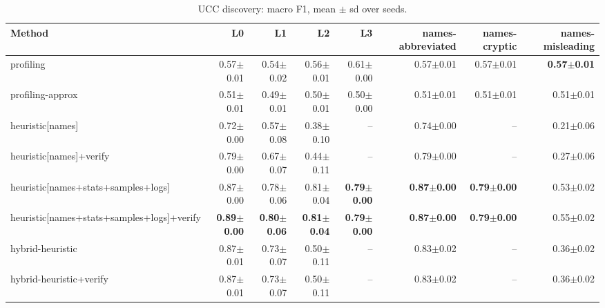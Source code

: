 \begin{table}[t]
  \centering
  \scriptsize
  \caption{UCC discovery: macro F1, mean $\pm$ sd over seeds.}
  \label{tab:bench-ucc}
  \begin{tabular}{lrrrrrrr}
    \toprule
    Method & L0 & L1 & L2 & L3 & names-abbreviated & names-cryptic & names-misleading \\
    \midrule
    profiling & 0.57{\scriptsize$\pm$0.01} & 0.54{\scriptsize$\pm$0.02} & 0.56{\scriptsize$\pm$0.01} & 0.61{\scriptsize$\pm$0.00} & 0.57{\scriptsize$\pm$0.01} & 0.57{\scriptsize$\pm$0.01} & \textbf{0.57{\scriptsize$\pm$0.01}} \\
    profiling-approx & 0.51{\scriptsize$\pm$0.01} & 0.49{\scriptsize$\pm$0.01} & 0.50{\scriptsize$\pm$0.01} & 0.50{\scriptsize$\pm$0.00} & 0.51{\scriptsize$\pm$0.01} & 0.51{\scriptsize$\pm$0.01} & 0.51{\scriptsize$\pm$0.01} \\
    heuristic[names] & 0.72{\scriptsize$\pm$0.00} & 0.57{\scriptsize$\pm$0.08} & 0.38{\scriptsize$\pm$0.10} & -- & 0.74{\scriptsize$\pm$0.00} & -- & 0.21{\scriptsize$\pm$0.06} \\
    heuristic[names]+verify & 0.79{\scriptsize$\pm$0.00} & 0.67{\scriptsize$\pm$0.07} & 0.44{\scriptsize$\pm$0.11} & -- & 0.79{\scriptsize$\pm$0.00} & -- & 0.27{\scriptsize$\pm$0.06} \\
    heuristic[names+stats+samples+logs] & 0.87{\scriptsize$\pm$0.00} & 0.78{\scriptsize$\pm$0.06} & 0.81{\scriptsize$\pm$0.04} & \textbf{0.79{\scriptsize$\pm$0.00}} & \textbf{0.87{\scriptsize$\pm$0.00}} & \textbf{0.79{\scriptsize$\pm$0.00}} & 0.53{\scriptsize$\pm$0.02} \\
    heuristic[names+stats+samples+logs]+verify & \textbf{0.89{\scriptsize$\pm$0.00}} & \textbf{0.80{\scriptsize$\pm$0.06}} & \textbf{0.81{\scriptsize$\pm$0.04}} & \textbf{0.79{\scriptsize$\pm$0.00}} & \textbf{0.87{\scriptsize$\pm$0.00}} & \textbf{0.79{\scriptsize$\pm$0.00}} & 0.55{\scriptsize$\pm$0.02} \\
    hybrid-heuristic & 0.87{\scriptsize$\pm$0.01} & 0.73{\scriptsize$\pm$0.07} & 0.50{\scriptsize$\pm$0.11} & -- & 0.83{\scriptsize$\pm$0.02} & -- & 0.36{\scriptsize$\pm$0.02} \\
    hybrid-heuristic+verify & 0.87{\scriptsize$\pm$0.01} & 0.73{\scriptsize$\pm$0.07} & 0.50{\scriptsize$\pm$0.11} & -- & 0.83{\scriptsize$\pm$0.02} & -- & 0.36{\scriptsize$\pm$0.02} \\
    \bottomrule
  \end{tabular}
\end{table}

